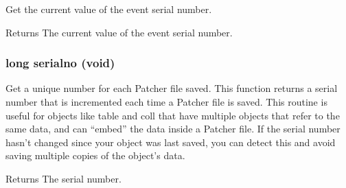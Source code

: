 Get the current value of the event serial number. \begin{DoxyReturn}{Returns}
The current value of the event serial number. 
\end{DoxyReturn}
\hypertarget{group__evnum_ga7e7dac31c7f482fec5bf64bf61cdc26b}{
\subsubsection[{serialno}]{\setlength{\rightskip}{0pt plus 5cm}long serialno (void)}}
\label{group__evnum_ga7e7dac31c7f482fec5bf64bf61cdc26b}


Get a unique number for each Patcher file saved. This function returns a serial number that is incremented each time a Patcher file is saved. This routine is useful for objects like table and coll that have multiple objects that refer to the same data, and can “embed” the data inside a Patcher file. If the serial number hasn’t changed since your object was last saved, you can detect this and avoid saving multiple copies of the object’s data.

\begin{DoxyReturn}{Returns}
The serial number. 
\end{DoxyReturn}
